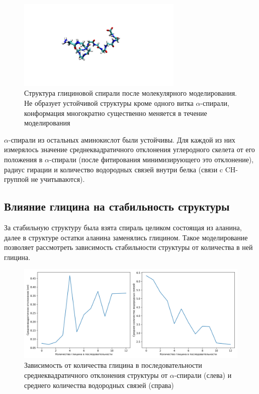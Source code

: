\documentclass[
11pt,%
tightenlines,%
twoside,%
onecolumn,%
nofloats,%
nobibnotes,%
nofootinbib,%
superscriptaddress,%
noshowpacs,%
centertags]%
{revtex4}
\begin{document}
\begin{figure}[h]
	\centering
	\includegraphics[width=0.7\textwidth]{gly_end}
	\caption{Структура глициновой спирали после молекулярного моделирования. 
		Не образует устойчивой структуры кроме одного витка $\alpha$-спирали, 
		конформация многократно существенно меняется в течение моделирования}
\end{figure}

$\alpha$-спирали из остальных аминокислот были устойчивы. 
Для каждой из них измерялось значение среднеквадратичного отклонения
углеродного скелета от его положения в $\alpha$-спирали (после фитирования минимизирующего это отклонение),
радиус гирации и количество водородных связей внутри белка (связи c CH-группой не учитываются).

\subsection{Влияние глицина на стабильность структуры}
За стабильную структуру была взята спираль целиком состоящая из аланина, 
далее в структуре остатки аланина заменялись глицином. 
Такое моделирование позволяет рассмотреть зависимость стабильности структуры от количества в ней глицина. \par

\begin{figure}[h]
	\centering
	\includegraphics[width=\textwidth]{gly}
	\caption{Зависимость от количества глицина в последовательности среднеквадратичного отклонения структуры от $\alpha$-спирали (слева) и среднего количества водородных связей (справа)}
\end{figure}
\end{document}
